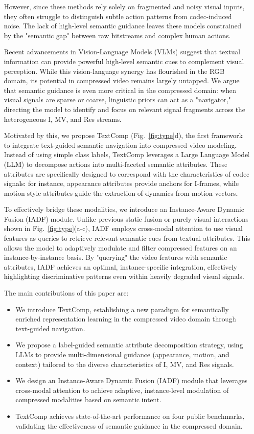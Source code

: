 \documentclass[runningheads]{llncs}
\begin{document}
However, since these methods rely solely on fragmented and noisy visual inputs, they often struggle to distinguish subtle action patterns from codec-induced noise. The lack of high-level semantic guidance leaves these models constrained by the "semantic gap" between raw bitstreams and complex human actions.

Recent advancements in Vision-Language Models (VLMs) suggest that textual information can provide powerful high-level semantic cues to complement visual perception. While this vision-language synergy has flourished in the RGB domain, its potential in compressed video remains largely untapped. We argue that semantic guidance is even more critical in the compressed domain: when visual signals are sparse or coarse, linguistic priors can act as a "navigator," directing the model to identify and focus on relevant signal fragments across the heterogeneous I, MV, and Res streams.

Motivated by this, we propose TextComp (Fig.~\ref{fig:type}d), the first framework to integrate text-guided semantic navigation into compressed video modeling. Instead of using simple class labels, TextComp leverages a Large Language Model (LLM) to decompose actions into multi-faceted semantic attributes. These attributes are specifically designed to correspond with the characteristics of codec signals: for instance, appearance attributes provide anchors for I-frames, while motion-style attributes guide the extraction of dynamics from motion vectors.

To effectively bridge these modalities, we introduce an Instance-Aware Dynamic Fusion (IADF) module. Unlike previous static fusion or purely visual interactions shown in Fig.~\ref{fig:type}(a-c), IADF employs cross-modal attention to use visual features as queries to retrieve relevant semantic cues from textual attributes. This allows the model to adaptively modulate and filter compressed features on an instance-by-instance basis. By "querying" the video features with semantic attributes, IADF achieves an optimal, instance-specific integration, effectively highlighting discriminative patterns even within heavily degraded visual signals.

The main contributions of this paper are:
\begin{itemize}
\item We introduce TextComp, establishing a new paradigm for semantically enriched representation learning in the compressed video domain through text-guided navigation.
\item We propose a label-guided semantic attribute decomposition strategy, using LLMs to provide multi-dimensional guidance (appearance, motion, and context) tailored to the diverse characteristics of I, MV, and Res signals.
\item We design an Instance-Aware Dynamic Fusion (IADF) module that leverages cross-modal attention to achieve adaptive, instance-level modulation of compressed modalities based on semantic intent.
\item TextComp achieves state-of-the-art performance on four public benchmarks, validating the effectiveness of semantic guidance in the compressed domain.
\end{itemize}
\end{document}
